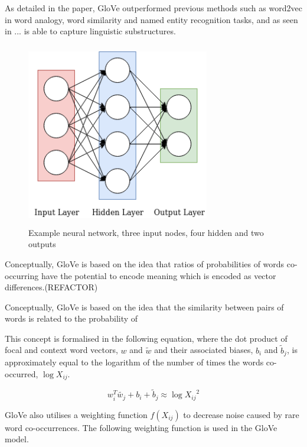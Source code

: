 \noindent 
\newline
\newline
As detailed in the paper, GloVe outperformed previous methods such as word2vec in word analogy, word similarity and named entity recognition tasks, and as seen in ... is able to capture linguistic substructures.

\begin{figure}[h]
	\includegraphics[width=8cm, height=8cm]{./figures/fig2}
	\centering
	\caption{Example neural network, three input nodes, four hidden and two outputs}
	\label{fig:fig2}
\end{figure}

\noindent
Conceptually, GloVe is based on the idea that ratios of probabilities of words co-occurring have the potential to encode meaning which is encoded as vector differences.(REFACTOR)

\noindent
Conceptually, GloVe is based on the idea that the similarity between pairs of words is related to the probability of  

\noindent
\newline
This concept is formalised in the following equation, where the dot product of focal and context word vectors, \(w\) and \(\tilde{w}\) and their associated biases, \(b_{i} \) and \(\tilde{b}_{j}\), is approximately equal to the logarithm of the number of times the words co-occurred, \(\log{X_{ij}}\).

\begin{equation}
w_{i}^{T} \tilde{w_{j}} + b_{i} + \tilde{b}_{j} \approx \log{X_{ij}}^{2}
\end{equation}

\noindent
\newline
GloVe also utilises a weighting function \(f(X_{ij})\) to decrease noise caused by rare word co-occurrences. The following weighting function is used in the GloVe model.

